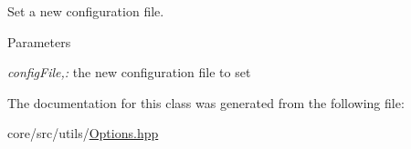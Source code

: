 Set a new configuration file. 


\begin{DoxyParams}{Parameters}
\item[{\em configFile,:}]the new configuration file to set \end{DoxyParams}


The documentation for this class was generated from the following file:\begin{DoxyCompactItemize}
\item 
core/src/utils/\hyperlink{Options_8hpp}{Options.hpp}\end{DoxyCompactItemize}
